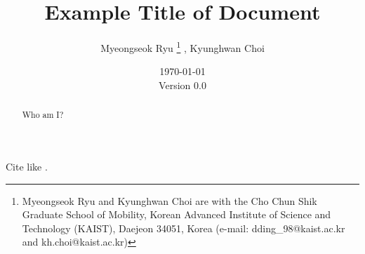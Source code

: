 \documentclass{article}
\title{
    Example Title of Document
}
\author{
    Myeongseok Ryu
    \thanks{
        Myeongseok Ryu and Kyunghwan Choi are with the Cho Chun Shik Graduate School of Mobility, Korean Advanced Institute of Science and Technology (KAIST), Daejeon 34051, Korea (e-mail: dding\_98@kaist.ac.kr and kh.choi@kaist.ac.kr)
        }%
    ,
    Kyunghwan Choi
    \footnotemark[1]
}
\date{
    \today
    \\
    Version 0.0
}
\newcommand*{\template}{../template}
\begin{document}
\maketitle

\begin{abstract}
    Who am I?
\end{abstract}

\tableofcontents



Cite like \cite{Khalil:2002aa}.





\begin{appendices}

\end{appendices}



\end{document}

